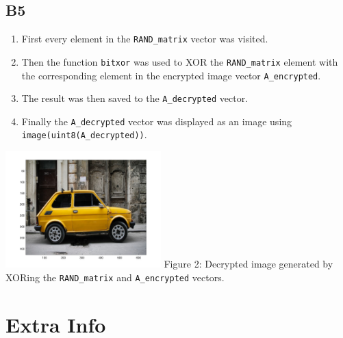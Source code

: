 \documentclass[12pt, letterpaper, titlepage, hidelinks]{article}
\begin{document}
		\subsection{B5}
			\begin{enumerate}
				\item First every element in the \verb|RAND_matrix| vector was visited.
				\item Then the function \verb|bitxor| was used to XOR the \verb|RAND_matrix| element with the corresponding element in the encrypted image vector \verb|A_encrypted|.
				\item The result was then saved to the \verb|A_decrypted| vector.
				\item Finally the \verb|A_decrypted| vector was displayed as an image using \verb|image(uint8(A_decrypted))|.
			\end{enumerate}
			\includegraphics[width=0.45\textwidth]{decrypted_image} \newline
			Figure 2: Decrypted image generated by XORing the \verb|RAND_matrix| and \verb|A_encrypted| vectors.
\section{Extra Info}
	
	
	
\end{document}
